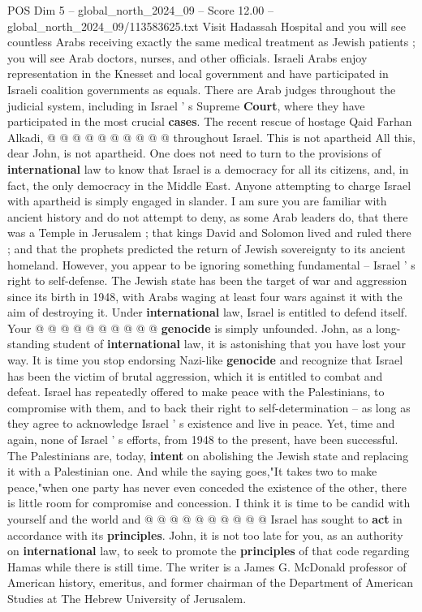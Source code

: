 \begin{textsample}{POS Dim 5 – global\_north\_2024\_09 – Score 12.00 – global\_north\_2024\_09/113583625.txt}
Visit Hadassah Hospital and you will see countless Arabs receiving exactly the same medical treatment as Jewish patients ; you will see Arab doctors, nurses, and other officials.
Israeli Arabs enjoy representation in the Knesset and local government and have participated in Israeli coalition governments as equals.
There are Arab judges throughout the judicial system, including in Israel ' s Supreme \textbf{Court}, where they have participated in the most crucial \textbf{cases}.
The recent rescue of hostage Qaid Farhan Alkadi, @ @ @ @ @ @ @ @ @ @ throughout Israel.
This is not apartheid All this, dear John, is not apartheid.
One does not need to turn to the provisions of \textbf{international} law to know that Israel is a democracy for all its citizens, and, in fact, the only democracy in the Middle East.
Anyone attempting to charge Israel with apartheid is simply engaged in slander.
I am sure you are familiar with ancient history and do not attempt to deny, as some Arab leaders do, that there was a Temple in Jerusalem ; that kings David and Solomon lived and ruled there ; and that the prophets predicted the return of Jewish sovereignty to its ancient homeland.
However, you appear to be ignoring something fundamental -- Israel ' s right to self-defense.
The Jewish state has been the target of war and aggression since its birth in 1948, with Arabs waging at least four wars against it with the aim of destroying it.
Under \textbf{international} law, Israel is entitled to defend itself.
Your @ @ @ @ @ @ @ @ @ @ \textbf{genocide} is simply unfounded.
John, as a long-standing student of \textbf{international} law, it is astonishing that you have lost your way.
It is time you stop endorsing Nazi-like \textbf{genocide} and recognize that Israel has been the victim of brutal aggression, which it is entitled to combat and defeat.
Israel has repeatedly offered to make peace with the Palestinians, to compromise with them, and to back their right to self-determination -- as long as they agree to acknowledge Israel ' s existence and live in peace.
Yet, time and again, none of Israel ' s efforts, from 1948 to the present, have been successful.
The Palestinians are, today, \textbf{intent} on abolishing the Jewish state and replacing it with a Palestinian one.
And while the saying goes,"It takes two to make peace,"when one party has never even conceded the existence of the other, there is little room for compromise and concession.
I think it is time to be candid with yourself and the world and @ @ @ @ @ @ @ @ @ @ Israel has sought to \textbf{act} in accordance with its \textbf{principles}.
John, it is not too late for you, as an authority on \textbf{international} law, to seek to promote the \textbf{principles} of that code regarding Hamas while there is still time.
The writer is a James G.
McDonald professor of American history, emeritus, and former chairman of the Department of American Studies at The Hebrew University of Jerusalem.

\end{textsample}
